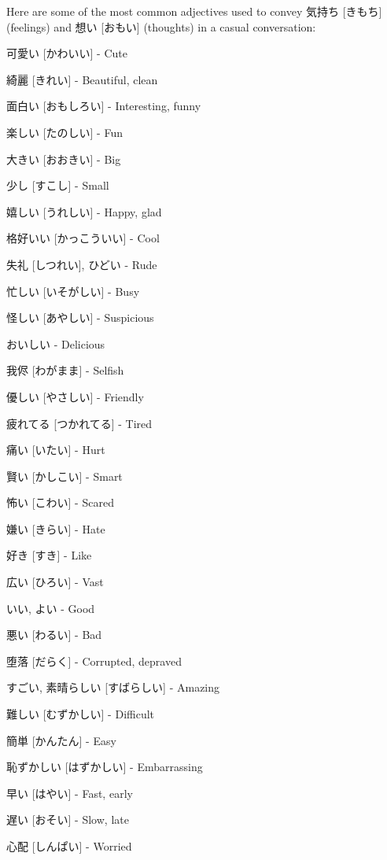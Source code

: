 \documentclass{article}
\begin{document}
\begin{CJK}{UTF8}{min}
\begin{multicols*}{3}
Here are some of the most common adjectives used to convey 気持ち [きもち] (feelings) and 想い [おもい] (thoughts) in a casual conversation:

\begin{colorize}
\item 可愛い [かわいい] - Cute
\item 綺麗 [きれい] - Beautiful, clean
\item 面白い [おもしろい] - Interesting, funny
\item 楽しい [たのしい] - Fun
\item 大きい [おおきい] - Big
\item 少し [すこし] - Small
\item 嬉しい [うれしい] - Happy, glad
\item 格好いい [かっこういい] - Cool
\item 失礼 [しつれい], ひどい - Rude
\item 忙しい [いそがしい] - Busy
\item 怪しい [あやしい] - Suspicious
\item おいしい - Delicious
\item 我侭 [わがまま] - Selfish
\item 優しい [やさしい] - Friendly
\item 疲れてる [つかれてる] - Tired
\item 痛い [いたい] - Hurt
\item 賢い [かしこい] - Smart
\item 怖い [こわい] - Scared
\item 嫌い [きらい] - Hate
\item 好き [すき] - Like
\item 広い [ひろい] - Vast
\item いい, よい - Good
\item 悪い [わるい] - Bad
\item 堕落 [だらく] - Corrupted, depraved
\item すごい, 素晴らしい [すばらしい] - Amazing
\item 難しい [むずかしい] - Difficult
\item 簡単 [かんたん] - Easy
\item 恥ずかしい [はずかしい] - Embarrassing
\item 早い [はやい] - Fast, early
\item 遅い [おそい] - Slow, late
\item 心配 [しんぱい] - Worried
\end{colorize}


\end{multicols*}
\end{CJK}
\end{document}
